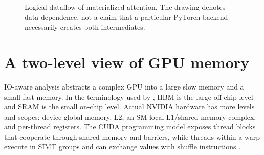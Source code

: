 \begin{figure}[htbp]
\centering
{}
\caption{Logical dataflow of materialized attention. The drawing denotes data dependence, not a claim that a particular PyTorch backend necessarily creates both intermediates.}
\label{fig:materialized}
\end{figure}

\section{A two-level view of GPU memory}

IO-aware analysis abstracts a complex GPU into a large slow memory and a small fast memory. In the terminology used by \citet{dao2022flashattention}, HBM is the large off-chip level and SRAM is the small on-chip level. Actual NVIDIA hardware has more levels and scopes: device global memory, L2, an SM-local L1/shared-memory complex, and per-thread registers. The CUDA programming model exposes thread blocks that cooperate through shared memory and barriers, while threads within a warp execute in SIMT groups and can exchange values with shuffle instructions \citep{nvidia2026programming,nickolls2008cuda}.

